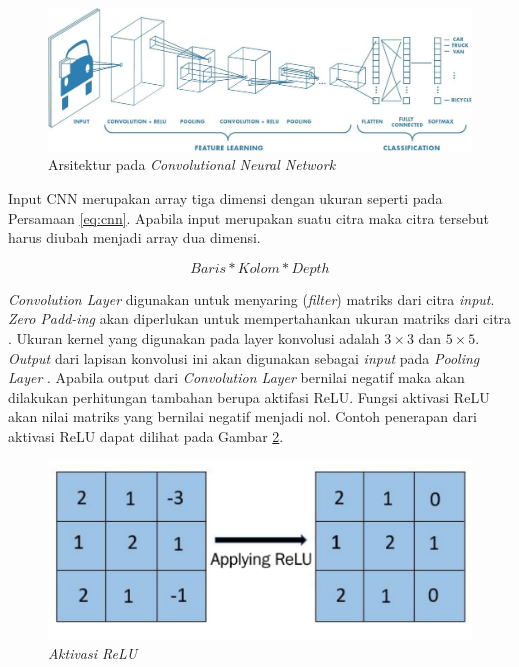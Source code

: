 \begin{figure} [ht] \centering
    \includegraphics[width=1\textwidth]{gambar/cnn.jpg}
    \caption{Arsitektur pada \emph{Convolutional Neural Network}}
    \label{fig:arsitektur cnn}
\end{figure}

Input CNN merupakan array tiga dimensi dengan ukuran seperti pada Persamaan \ref{eq:cnn}. Apabila input merupakan suatu citra maka citra tersebut harus diubah menjadi array dua dimensi. 

\begin{equation}
\label{eq:cnn}
Baris * Kolom * Depth
\end{equation}

\emph{Convolution Layer} digunakan untuk menyaring (\emph{filter}) matriks dari citra \emph{input}. \emph{Zero Padd-ing} akan diperlukan untuk mempertahankan ukuran matriks dari citra \parencite{dwitama2019klasifikasi}. Ukuran kernel yang digunakan pada layer konvolusi adalah \(3 \times 3\) dan \(5 \times 5\). \emph{Output} dari lapisan konvolusi ini akan digunakan sebagai \emph{input} pada \emph{Pooling Layer} \parencite{hakim2018penerapan}. Apabila output dari \emph{Convolution Layer} bernilai negatif maka akan dilakukan perhitungan tambahan berupa aktifasi ReLU. Fungsi aktivasi ReLU akan nilai matriks yang bernilai negatif menjadi nol. Contoh penerapan dari aktivasi ReLU dapat dilihat pada Gambar \ref{fig:Aktivasi ReLU}.

\begin{figure} [ht] \centering
    \includegraphics[width=.6\textwidth]{gambar/relu.png}
    \caption{\emph{Aktivasi ReLU}}
    \label{fig:Aktivasi ReLU}
\end{figure}


